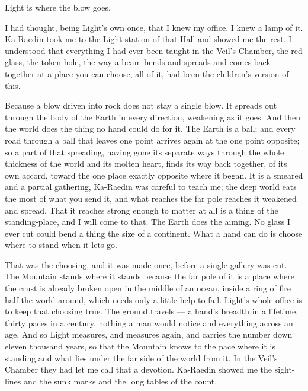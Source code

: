 \ornament

Light is where the blow goes.\par

I had thought, being Light's own once, that I knew my office. I knew a lamp of it. Ka-Raedin took me to the Light station of that Hall and showed me the rest. I understood that everything I had ever been taught in the Veil's Chamber, the red glass, the token-hole, the way a beam bends and spreads and comes back together at a place you can choose, all of it, had been the children's version of this.\par

Because a blow driven into rock does not stay a single blow. It spreads out through the body of the Earth in every direction, weakening as it goes. And then the world does the thing no hand could do for it. The Earth is a ball; and every road through a ball that leaves one point arrives again at the one point opposite; so a part of that spreading, having gone its separate ways through the whole thickness of the world and its molten heart, finds its way back together, of its own accord, toward the one place exactly opposite where it began. It is a smeared and a partial gathering, Ka-Raedin was careful to teach me; the deep world eats the most of what you send it, and what reaches the far pole reaches it weakened and spread. That it reaches strong enough to matter at all is a thing of the standing-place, and I will come to that. The Earth does the aiming. No glass I ever cut could bend a thing the size of a continent. What a hand can do is choose where to stand when it lets go.\par

That was the choosing, and it was made once, before a single gallery was cut. The Mountain stands where it stands because the far pole of it is a place where the crust is already broken open in the middle of an ocean, inside a ring of fire half the world around, which needs only a little help to fail. Light's whole office is to keep that choosing true. The ground travels --- a hand's breadth in a lifetime, thirty paces in a century, nothing a man would notice and everything across an age. And so Light measures, and measures again, and carries the number down eleven thousand years, so that the Mountain knows to the pace where it is standing and what lies under the far side of the world from it. In the Veil's Chamber they had let me call that a devotion. Ka-Raedin showed me the sight-lines and the sunk marks and the long tables of the count.\par

